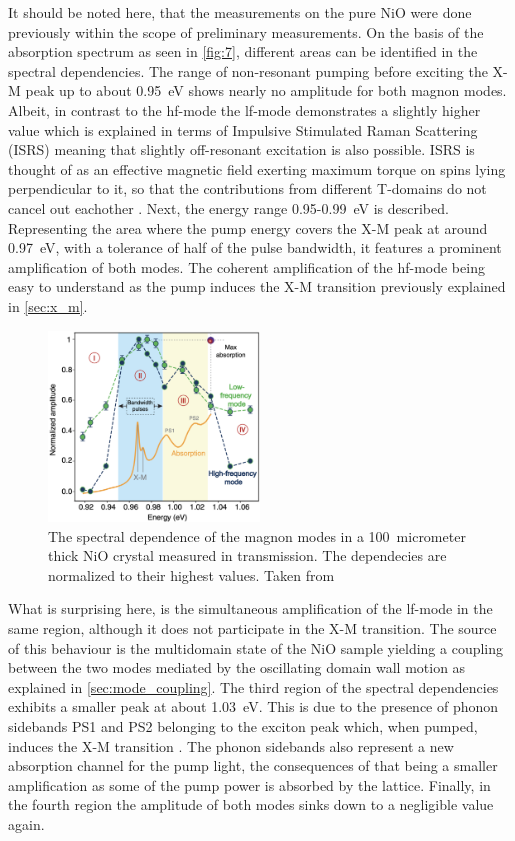 It should be noted here, that the measurements on the pure NiO were done previously within the scope of preliminary measurements.
On the basis of the absorption spectrum as seen in \autoref{fig:7}, different areas can be identified in the spectral dependencies.
The range of non-resonant pumping before exciting the X-M peak up to about \qty{0.95}{eV} shows nearly no amplitude for both magnon modes.
Albeit, in contrast to the hf-mode the lf-mode demonstrates a slightly higher value which is explained in terms of Impulsive Stimulated Raman Scattering (ISRS)  meaning that slightly off-resonant excitation is also possible.
ISRS is thought of as an effective magnetic field exerting maximum torque on spins lying perpendicular to it, so that the contributions from different T-domains do not cancel out eachother .
Next, the energy range 0.95-\qty{0.99}{eV} is described.
Representing the area where the pump energy covers the X-M peak at around \qty{0.97}{eV}, with a tolerance of half of the pulse bandwidth, it features a prominent amplification of both modes.
The coherent amplification of the hf-mode being easy to understand as the pump induces the X-M transition previously explained in \autoref{sec:x_m}.
\begin{figure}[ht]
    \centering
    \includegraphics[width=0.5\textwidth]{pictures/7.png}
    \caption{The spectral dependence of the magnon modes in a \qty{100}{micrometer} thick NiO crystal measured in transmission. The dependecies are normalized to their highest values. Taken from }
    \label{fig:7}
\end{figure}
\FloatBarrier
What is surprising here, is the simultaneous amplification of the lf-mode in the same region, although it does not participate in the X-M transition.
The source of this behaviour is the multidomain state of the NiO sample yielding a coupling between the two modes mediated by the oscillating domain wall motion as explained in \autoref{sec:mode_coupling}.
The third region of the spectral dependencies exhibits a smaller peak at about \qty{1.03}{eV}.
This is due to the presence of phonon sidebands PS1 and PS2 belonging to the exciton peak which, when pumped, induces the X-M transition .
The phonon sidebands also represent a new absorption channel for the pump light, the consequences of that being a smaller amplification as some of the pump power is absorbed by the lattice.
Finally, in the fourth region the amplitude of both modes sinks down to a negligible value again.

